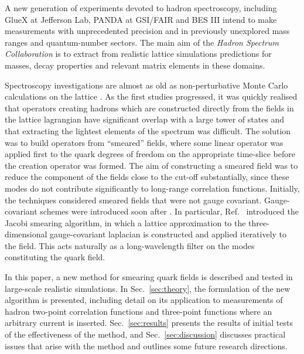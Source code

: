 A new generation of experiments devoted to hadron spectroscopy,
including GlueX at Jefferson Lab, PANDA at GSI/FAIR and BES III
intend to make measurements with unprecedented precision and in
previously unexplored mass ranges and quantum-number sectors. The main aim of
the {\em Hadron Spectrum Collaboration} is to extract from realistic
lattice simulations predictions for masses, decay properties and relevant matrix
elements in these domains.

Spectroscopy investigations are almost as old as non-perturbative Monte Carlo
calculations on the lattice \cite{Hamber:1981zn,Weingarten:1980hx}.  As the
first studies progressed, it was quickly realised that operators
creating hadrons which are constructed directly from the fields in the lattice
lagrangian have significant overlap with a large tower of states and that
extracting the lightest elements of the spectrum was difficult. The solution was
to build operators from ``smeared'' fields, where some linear operator was
applied first to the quark degrees of freedom on the appropriate time-slice
before the creation operator was formed. The aim of constructing a smeared
field was to reduce the component of the fields close to the
cut-off substantially, since these modes do not contribute significantly to
long-range correlation functions.
Initially, the techniques considered smeared fields that were not
gauge covariant. Gauge-covariant schemes were introduced soon after
\cite{Gusken:1989ad,
Allton:1993wc}. In particular, Ref.~\cite{Allton:1993wc} introduced the Jacobi
smearing algorithm, in which a lattice approximation to the three-dimensional
gauge-covariant laplacian is constructed and applied iteratively to the field.
This acts naturally as a long-wavelength filter on the modes constituting the
quark field.


In this paper, a new method for smearing quark fields is described and tested in
large-scale realistic simulations.
In Sec.~\ref{sec:theory}, the formulation of the new algorithm is presented,
including detail on its application to measurements of hadron two-point
correlation functions and three-point functions where an arbitrary current is
inserted.
Sec.~\ref{sec:results} presents the results of initial tests of the
effectiveness of the method, and Sec.~\ref{sec:discussion} discusses practical
issues that arise with the method and outlines some future research directions.
